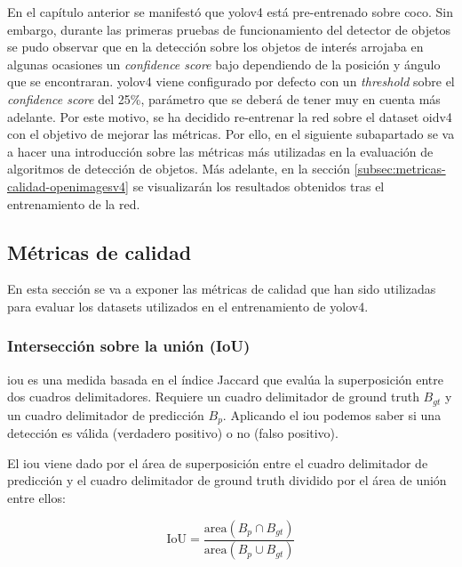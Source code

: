 En el capítulo anterior se manifestó que \gls{yolov4} está pre-entrenado sobre \gls{coco}. Sin embargo, durante las primeras pruebas de funcionamiento del detector de objetos se pudo observar que en la detección sobre los objetos de interés arrojaba en algunas ocasiones un \textit{confidence score} bajo dependiendo de la posición y ángulo que se encontraran. \gls{yolov4} viene configurado por defecto con un \textit{threshold} sobre el \textit{confidence score} del 25\%, parámetro que se deberá de tener muy en cuenta más adelante. Por este motivo, se ha decidido re-entrenar la red sobre el dataset \gls{oidv4} con el objetivo de mejorar las métricas. Por ello, en el siguiente subapartado se va a hacer una introducción sobre las métricas más utilizadas en la evaluación de algoritmos de detección de objetos. Más adelante, en la sección \ref{subsec:metricas-calidad-openimagesv4} se visualizarán los resultados obtenidos tras el entrenamiento de la red.

\subsection{Métricas de calidad}
\label{subsec:metricas-calidad}

En esta sección se va a exponer las métricas de calidad \cite{padillaCITE2020} que han sido utilizadas para evaluar los datasets utilizados en el entrenamiento de \gls{yolov4}.

\subsubsection{Intersección sobre la unión (IoU)}
\label{subsubsec:iou}

\gls{iou} es una medida basada en el índice Jaccard que evalúa la superposición entre dos cuadros delimitadores. Requiere un cuadro delimitador de ground truth $B_{gt}$ y un cuadro delimitador de predicción $B_{p}$. Aplicando el \gls{iou} podemos saber si una detección es válida (verdadero positivo) o no (falso positivo).

El \gls{iou} viene dado por el área de superposición entre el cuadro delimitador de predicción y el cuadro delimitador de ground truth dividido por el área de unión entre ellos:

\begin{equation}
\label{eq:iou}
\text{IoU}=\frac{\text{area}\left(B_{p} \cap B_{gt} \right)}{\text{area}\left(B_{p} \cup B_{gt} \right)}    
\end{equation}

